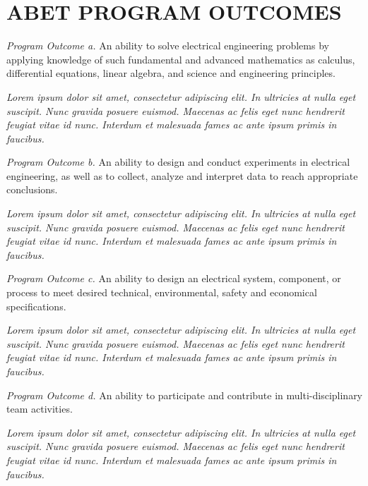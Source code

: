 \documentclass[letterpaper]{../kuthesis/kuthesis}
\begin{document}
\chapter{ABET PROGRAM OUTCOMES}
\singlespace
\textit{Program Outcome a.}  An ability to solve electrical engineering problems by applying knowledge of such fundamental and advanced mathematics as calculus, differential equations, linear algebra, and science and engineering principles.
\begin{adjustwidth}{0.5in}{0in}
\textit{Lorem ipsum dolor sit amet, consectetur adipiscing elit. In ultricies at nulla eget suscipit. Nunc gravida posuere euismod. Maecenas ac felis eget nunc hendrerit feugiat vitae id nunc. Interdum et malesuada fames ac ante ipsum primis in faucibus. }\\
\end{adjustwidth} 
\textit{Program Outcome b.}  An ability to design and conduct experiments in electrical engineering, as well as to collect, analyze and interpret data to reach appropriate conclusions.
\begin{adjustwidth}{0.5in}{0in}
\textit{Lorem ipsum dolor sit amet, consectetur adipiscing elit. In ultricies at nulla eget suscipit. Nunc gravida posuere euismod. Maecenas ac felis eget nunc hendrerit feugiat vitae id nunc. Interdum et malesuada fames ac ante ipsum primis in faucibus. }\\
\end{adjustwidth} 
\textit{Program Outcome c.}  An ability to design an electrical system, component, or process to meet desired technical, environmental, safety and economical specifications.
\begin{adjustwidth}{0.5in}{0in}
\textit{Lorem ipsum dolor sit amet, consectetur adipiscing elit. In ultricies at nulla eget suscipit. Nunc gravida posuere euismod. Maecenas ac felis eget nunc hendrerit feugiat vitae id nunc. Interdum et malesuada fames ac ante ipsum primis in faucibus. }\\
\end{adjustwidth} 
\textit{Program Outcome d.}  An ability to participate and contribute in multi-disciplinary team activities.
\begin{adjustwidth}{0.5in}{0in}
\textit{Lorem ipsum dolor sit amet, consectetur adipiscing elit. In ultricies at nulla eget suscipit. Nunc gravida posuere euismod. Maecenas ac felis eget nunc hendrerit feugiat vitae id nunc. Interdum et malesuada fames ac ante ipsum primis in faucibus. }\\
\end{adjustwidth} 
\end{document}
